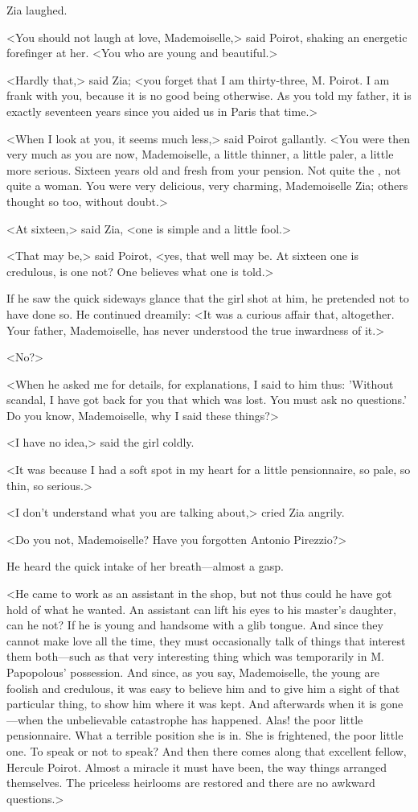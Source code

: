 Zia laughed.

<You should not laugh at love, Mademoiselle,> said Poirot, shaking an energetic forefinger at her. <You who are young and beautiful.>

<Hardly that,> said Zia; <you forget that I am thirty-three, M. Poirot. I am frank with you, because it is no good being otherwise. As you told my father, it is exactly seventeen years since you aided us in Paris that time.>

<When I look at you, it seems much less,> said Poirot gallantly. <You were then very much as you are now, Mademoiselle, a little thinner, a little paler, a little more serious. Sixteen years old and fresh from your pension. Not quite the , not quite a woman. You were very delicious, very charming, Mademoiselle Zia; others thought so too, without doubt.>

<At sixteen,> said Zia, <one is simple and a little fool.>

<That may be,> said Poirot, <yes, that well may be. At sixteen one is credulous, is one not? One believes what one is told.>

If he saw the quick sideways glance that the girl shot at him, he pretended not to have done so. He continued dreamily: <It was a curious affair that, altogether. Your father, Mademoiselle, has never understood the true inwardness of it.>

<No?>

<When he asked me for details, for explanations, I said to him thus: 'Without scandal, I have got back for you that which was lost. You must ask no questions.' Do you know, Mademoiselle, why I said these things?>

<I have no idea,> said the girl coldly.

<It was because I had a soft spot in my heart for a little pensionnaire, so pale, so thin, so serious.>

<I don't understand what you are talking about,> cried Zia angrily.

<Do you not, Mademoiselle? Have you forgotten Antonio Pirezzio?>

He heard the quick intake of her breath—almost a gasp.

<He came to work as an assistant in the shop, but not thus could he have got hold of what he wanted. An assistant can lift his eyes to his master's daughter, can he not? If he is young and handsome with a glib tongue. And since they cannot make love all the time, they must occasionally talk of things that interest them both—such as that very interesting thing which was temporarily in M. Papopolous' possession. And since, as you say, Mademoiselle, the young are foolish and credulous, it was easy to believe him and to give him a sight of that particular thing, to show him where it was kept. And afterwards when it is gone—when the unbelievable catastrophe has happened. Alas! the poor little pensionnaire. What a terrible position she is in. She is frightened, the poor little one. To speak or not to speak? And then there comes along that excellent fellow, Hercule Poirot. Almost a miracle it must have been, the way things arranged themselves. The priceless heirlooms are restored and there are no awkward questions.>

